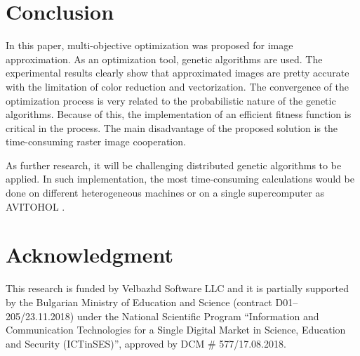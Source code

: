 \documentclass[conference]{IEEEtran}
\begin{document}
\section{Conclusion}

In this paper, multi-objective optimization was proposed for image approximation. As an optimization tool, genetic algorithms are used. The experimental results clearly show that approximated images are pretty accurate with the limitation of color reduction and vectorization. The convergence of the optimization process is very related to the probabilistic nature of the genetic algorithms. Because of this, the implementation of an efficient fitness function is critical in the process. The main disadvantage of the proposed solution is the time-consuming raster image cooperation. 

As further research, it will be challenging distributed genetic algorithms to be applied. In such implementation, the most time-consuming calculations would be done on different heterogeneous machines or on a single supercomputer as AVITOHOL \cite{Tashev-Tasheva-Petrov-2019}. 

\section*{Acknowledgment}

This research is funded by Velbazhd Software LLC and it is partially supported by the Bulgarian Ministry of Education and Science (contract D01–205/23.11.2018) under the National Scientific Program ``Information and Communication Technologies for a Single Digital Market in Science, Education and Security (ICTinSES)'', approved by DCM \# 577/17.08.2018.
\end{document}
